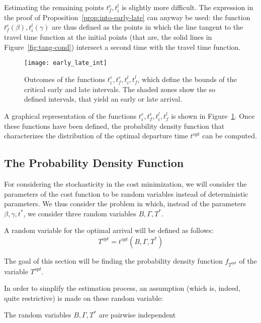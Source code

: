 Estimating the remaining points \(t_f^e, t_i^l\) is slightly more difficult.
The expression in the proof of Proposition~\ref{prop:into-early-late} can anyway be used:
the function \(t_f^e(\beta), t_i^l(\gamma)\)
are thus defined as the points in which the line tangent to the travel time function at the initial points
(that are, the solid lines in Figure~\ref{fig:tang-cond})
intersect a second time with the travel time function.

\begin{figure}
  \centering
  \texttt{[image: early\_late\_int]}
  \caption{Outcomes of the functions \(t_i^e, t_f^e, t_i^l, t_f^l\),
    which define the bounds of the critical early and late intervals.
    The shaded zones show the so defined intervals,
  that yield an early or late arrival.}
  \label{fig:early-late-int}
\end{figure}

A graphical representation of the functions \(t_i^e, t_f^e, t_i^l, t_f^l\) is shown in Figure~\ref{fig:early-late-int}.
Once these functions have been defined,
the probability density function that characterizes the distribution of the optimal departure time \(t^{opt}\) can be computed.

\subsection{The Probability Density Function}

For considering the stochasticity in the cost minimization,
we will consider the parameters of the cost function to be random variables instead of deterministic parameters.
We thus consider the problem in which,
instead of the parameters \(\beta, \gamma, t^*\),
we consider three random variables \(B, \Gamma, T^*\).

A random variable for the optimal arrival will be defined as follows:
\begin{equation}
  \label{eq:rv-opt-arr}
  T^{opt} = t^{opt}(B, \Gamma, T^*)
\end{equation}

The goal of this section will be finding the probability density function \(f_{T^{opt}}\) of the variable \(T^{opt}\).

In order to simplify the estimation process, an assumption (which is, indeed, quite restrictive)
is made on these random variable:

\begin{assumption}
  The random variables \(B, \Gamma, T^*\) are pairwise independent
\end{assumption}

